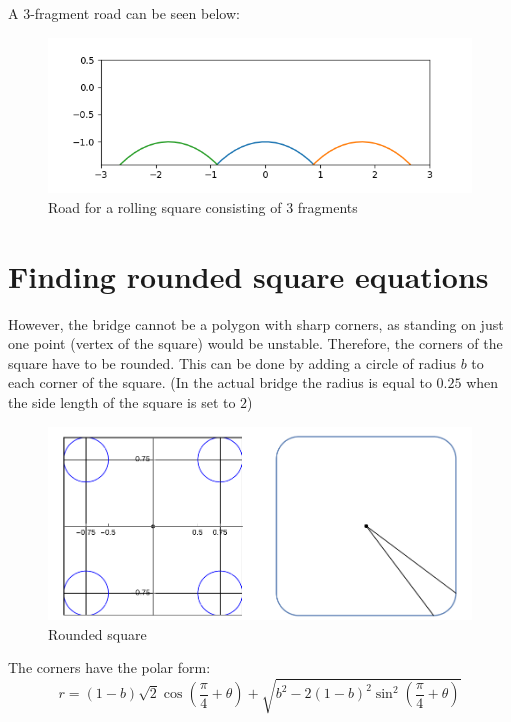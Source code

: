 \documentclass[12pt]{article}
\begin{document}
        A 3-fragment road can be seen below:
        \begin{figure}[H]
            \centering
            \includegraphics[width=\linewidth]{images/road_3.png}
            \caption{Road for a rolling square consisting of 3 fragments}\label{fig:road3}
        \end{figure}

    \section{Finding rounded square equations}

        However, the bridge cannot be a polygon with sharp corners, as standing on just one point (vertex of the square) would be unstable. Therefore, the corners of the square have to be rounded. This can be done by adding a circle of radius $b$ to each corner of the square. (In the actual bridge the radius is equal to $0.25$ when the side length of the square is set to $2$)

        \begin{figure}[H]
            \centering
            \includegraphics[width=0.9\linewidth]{images/rounded_square.png}
            \caption{Rounded square\cite{bridge_wolfram}}\label{fig:rounded_square}
        \end{figure}


        The corners have the polar form:
        \begin{equation}
            r = (1-b)\sqrt{2} \cos (\frac{\pi}{4} + \theta) + \sqrt{b^2 - 2(1-b)^2 \sin^2 (\frac{\pi}{4}+\theta)}
        \end{equation}
\end{document}
